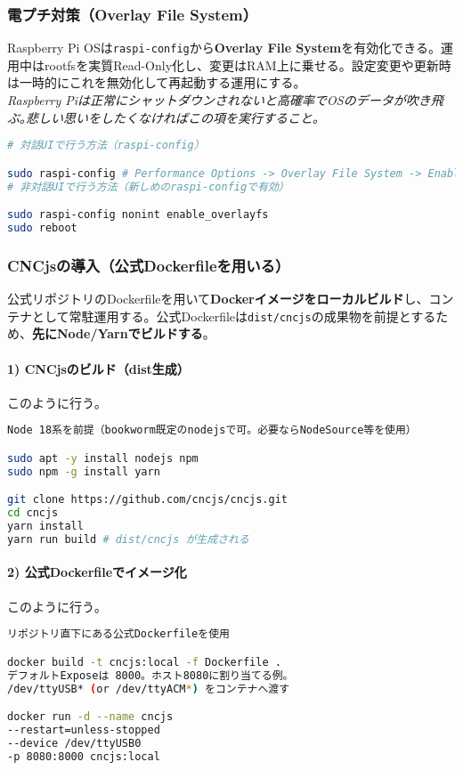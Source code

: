 \documentclass[uplatex,dvipdfmx]{ujarticle}
\begin{document}
\subsubsection*{電プチ対策（Overlay File System）}
Raspberry Pi OSは\texttt{raspi-config}から\textbf{Overlay File System}を有効化できる。運用中はrootfsを実質Read-Only化し、変更はRAM上に乗せる。設定変更や更新時は一時的にこれを無効化して再起動する運用にする。\\
\emph{Raspberry Piは正常にシャットダウンされないと高確率でOSのデータが吹き飛ぶ｡悲しい思いをしたくなければこの項を実行すること｡}

\begin{lstlisting}[caption=OverlayFSの有効化（対話/非対話の例）, label=code:overlay, language=bash]
# 対話UIで行う方法（raspi-config）

sudo raspi-config # Performance Options -> Overlay File System -> Enable
# 非対話UIで行う方法（新しめのraspi-configで有効）

sudo raspi-config nonint enable_overlayfs
sudo reboot
\end{lstlisting}

\subsubsection*{CNCjsの導入（公式Dockerfileを用いる）}

公式リポジトリのDockerfileを用いて\textbf{Dockerイメージをローカルビルド}し、コンテナとして常駐運用する。公式Dockerfileは\texttt{dist/cncjs}の成果物を前提とするため、\textbf{先にNode/Yarnでビルドする}。

\paragraph{1) CNCjsのビルド（dist生成）} 
このように行う｡
\begin{lstlisting}[caption=Node/Yarnでフロントをビルド（Pi上で可）, label=code:build-dist, language=bash]
Node 18系を前提（bookworm既定のnodejsで可。必要ならNodeSource等を使用）

sudo apt -y install nodejs npm
sudo npm -g install yarn

git clone https://github.com/cncjs/cncjs.git
cd cncjs
yarn install
yarn run build # dist/cncjs が生成される
\end{lstlisting}
\newpage
\paragraph{2) 公式Dockerfileでイメージ化}
このように行う｡
\begin{lstlisting}[caption=Dockerビルドと起動, label=code:docker-run, language=bash]
リポジトリ直下にある公式Dockerfileを使用

docker build -t cncjs:local -f Dockerfile .
デフォルトExposeは 8000。ホスト8080に割り当てる例。
/dev/ttyUSB* (or /dev/ttyACM*) をコンテナへ渡す

docker run -d --name cncjs
--restart=unless-stopped
--device /dev/ttyUSB0
-p 8080:8000 cncjs:local
\end{lstlisting}
\end{document}
